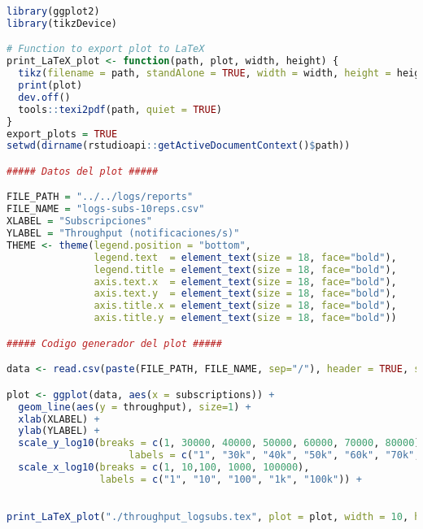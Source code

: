 \begin{lstlisting}[language=R, caption={Programa en R para obtener la carga representada en \autoref{fig:subs_workload-growing}}]
library(ggplot2)
library(tikzDevice)

# Function to export plot to LaTeX
print_LaTeX_plot <- function(path, plot, width, height) {
  tikz(filename = path, standAlone = TRUE, width = width, height = height)
  print(plot)
  dev.off()
  tools::texi2pdf(path, quiet = TRUE)
}
export_plots = TRUE
setwd(dirname(rstudioapi::getActiveDocumentContext()$path))

##### Datos del plot #####

FILE_PATH = "../../logs/reports"
FILE_NAME = "logs-subs-10reps.csv"
XLABEL = "Subscripciones"
YLABEL = "Throughput (notificaciones/s)"
THEME <- theme(legend.position = "bottom",
               legend.text  = element_text(size = 18, face="bold"),
               legend.title = element_text(size = 18, face="bold"),
               axis.text.x  = element_text(size = 18, face="bold"),
               axis.text.y  = element_text(size = 18, face="bold"),
               axis.title.x = element_text(size = 18, face="bold"),
               axis.title.y = element_text(size = 18, face="bold"))

##### Codigo generador del plot #####

data <- read.csv(paste(FILE_PATH, FILE_NAME, sep="/"), header = TRUE, sep = ",")

plot <- ggplot(data, aes(x = subscriptions)) +
  geom_line(aes(y = throughput), size=1) +
  xlab(XLABEL) +
  ylab(YLABEL) +
  scale_y_log10(breaks = c(1, 30000, 40000, 50000, 60000, 70000, 80000),
                     labels = c("1", "30k", "40k", "50k", "60k", "70k", "80k")) +
  scale_x_log10(breaks = c(1, 10,100, 1000, 100000),
                labels = c("1", "10", "100", "1k", "100k")) +
  

print_LaTeX_plot("./throughput_logsubs.tex", plot = plot, width = 10, height = 5)
\end{lstlisting}

